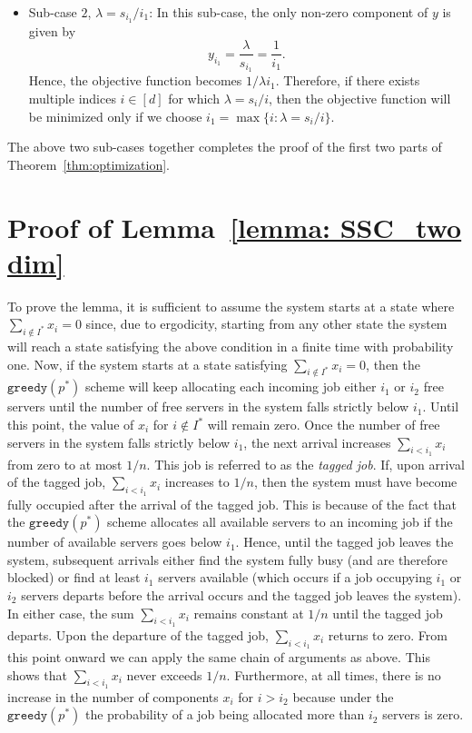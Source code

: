 \documentclass[a4paper]{article}
\theoremstyle{plain}
\theoremstyle{definition}
\theoremstyle{case}
\theoremstyle{remark}
\begin{document}
\begin{enumerate}
\begin{itemize}
    \item Sub-case $2$, $\lambda =  s_{i_1} / i_1$: In this sub-case, the only non-zero component of $y$ is given by 
    $$
    y_{i_1}  =  \frac{\lambda}{s_{i_1}} = \frac{1}{i_1}.$$
    Hence, the objective function becomes $1/\lambda i_1$. Therefore, if there exists multiple indices $i \in [d]$ for which $\lambda=s_i/i$, then the objective function will be minimized only if we choose $i_1 = \max \{i: \lambda   = s_{i} / i \}$. 
     \end{itemize}
     The above two sub-cases together completes the proof of the first two parts of Theorem~\ref{thm:optimization}.
\end{enumerate}
%

\section{Proof of Lemma~\ref{lemma: SSC_two dim}}

To prove the lemma, it is sufficient to assume the system starts at a state where $\sum_{ i\not\in I^*}x_i=0$ since, due to ergodicity, starting from any other state the system will reach a state satisfying the above condition in a finite time with probability one. Now, if the system starts at a state satisfying $\sum_{ i\not\in I^*}x_i=0$, then the $\texttt{greedy}(p^*)$ scheme will keep allocating each incoming job either $i_1$ or $i_2$ free servers until the number of free servers in the system falls strictly below $i_1$. Until this point, the value of $x_{i}$ for $i \notin I^*$ will remain zero. Once the number of free servers in the system falls strictly below $i_1$, the next arrival increases $\sum_{i < i_1} x_i$ from zero to at most $1/n$. This job is referred to as the {\em tagged job}. If, upon arrival of the tagged job, $\sum_{i < i_1} x_i$ increases to $1/n$, then the system must have become fully occupied after the arrival of the tagged job. This is because of the fact that the $\texttt{greedy}(p^*)$ scheme allocates all available servers to an incoming job if the number of available servers goes below $i_1$. Hence, until the tagged job leaves the system, subsequent arrivals either find the system fully busy (and are therefore blocked) or find at least $i_1$ servers available (which occurs if a job occupying $i_1$ or $i_2$ servers departs before the arrival occurs and the tagged job leaves the system). In either case, the sum $\sum_{i < i_1} x_i$ remains constant at $1/n$ until the tagged job departs. Upon the departure of the tagged job, $\sum_{i < i_1} x_i$ returns to zero. From this point onward we can apply the same chain of arguments as above. This shows that $\sum_{i < i_1} x_i$ never exceeds $1/n$. Furthermore, at all times, there is no increase in the number of components $x_i$ for $i > i_2$ because under the $\texttt{greedy}(p^*)$ the probability of a job being allocated more than $i_2$ servers is zero.
\end{document}
